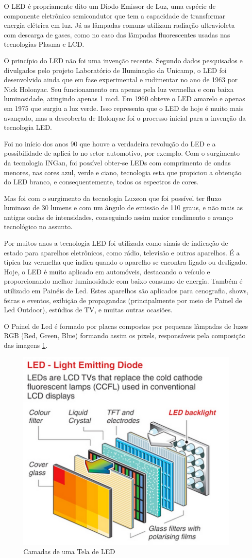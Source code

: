 O LED é propriamente dito um Diodo Emissor de Luz, uma espécie de componente eletrônico semicondutor que tem a capacidade de transformar energia elétrica em luz. Já as lâmpadas comuns utilizam radiação ultravioleta com descarga de gases, como no caso das lâmpadas fluorescentes usadas nas tecnologias Plasma e LCD. 

O princípio do LED não foi uma invenção recente. Segundo dados pesquisados e divulgados pelo projeto Laboratório de Iluminação da Unicamp, o LED foi desenvolvido ainda que em fase experimental e rudimentar no ano de 1963 por Nick Holonyac. Seu funcionamento era apenas pela luz vermelha e com baixa luminosidade, atingindo apenas 1 mcd. Em 1960 obteve o LED amarelo e apenas em 1975 que surgiu a luz verde. Isso representa que o LED de hoje é muito mais avançado, mas a descoberta de Holonyac foi o processo inicial para a invenção da tecnologia LED.

Foi no início dos anos 90 que houve a verdadeira revolução do LED e a possibilidade de aplicá-lo no setor automotivo, por exemplo. Com o surgimento da tecnologia INGan, foi possível obter-se LEDs com comprimento de ondas menores, nas cores azul, verde e ciano, tecnologia esta que propiciou a obtenção do LED branco, e consequentemente, todos os espectros de cores.

Mas foi com o surgimento da tecnologia Luxeon que foi possível ter fluxo luminoso de 30 lumens e com um ângulo de emissão de 110 graus, e não mais as antigas ondas de intensidades, conseguindo assim maior rendimento e avanço tecnológico no assunto.

Por muitos anos a tecnologia LED foi utilizada como sinais de indicação de estado para aparelhos eletrônicos, como rádio, televisão e outros aparelhos. É a típica luz vermelha que indica quando o aparelho se encontra ligado ou desligado. Hoje, o LED é muito aplicado em automóveis, destacando o veículo e proporcionando melhor luminosidade com baixo consumo de energia. Também é utilizado em Painéis de Led. Estes aparelhos são aplicados para cenografia, shows, feiras e eventos, exibição de propagandas (principalmente por meio de Painel de Led Outdoor), estúdios de TV, e muitas outras ocasiões.

O Painel de Led é formado por placas compostas por pequenas lâmpadas de luzes RGB (Red, Green, Blue) formando assim os pixels, responsáveis pela composição das imagens \ref{fig:camadas_led}.

\begin{figure}[!h]
  \centering
  \includegraphics[width=.40\textwidth]{./figuras/camadas_led} 
  \caption{Camadas de uma Tela de LED}
  \label{fig:camadas_led} 
\end{figure}




















